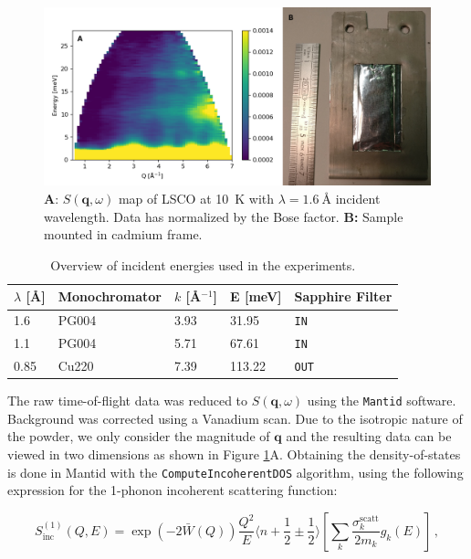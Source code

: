 \begin{figure}
    \centering
    \includegraphics[width=\textwidth]{fig/gdos/sample_sqw.png}
    \caption[$S(\bm{q}, \omega)$ map and picture of sample]{\textbf{A}: $S(\bm{q}, \omega)$ map of LSCO at \SI{10}{K} with $\lambda = \SI{1.6}{\angstrom}$ incident wavelength. Data has normalized by the Bose factor. \textbf{B:} Sample mounted in cadmium frame.}
    \label{fig:sample_sqw}
\end{figure}

\begin{table}[b]
    \centering
    \begin{tabular}{lllll}\toprule
    $\lambda$ [\AA] & Monochromator  & $k$ [\AA$^{-1}$] & E [meV] & Sapphire Filter     \\ \midrule
    1.6             & PG004 & 3.93            & 31.95   & \texttt{IN}  \\
    1.1             & PG004 & 5.71            & 67.61   & \texttt{IN}  \\
    0.85            & Cu220 & 7.39            & 113.22  & \texttt{OUT} \\ \bottomrule
    \end{tabular}
    \caption[IN4: Incident energies]{Overview of incident energies used in the experiments.}
    \label{tab:in4_mono}
\end{table}

The raw time-of-flight data was reduced to $S(\bm{q},\omega)$ using the \texttt{Mantid} \cite{Arnold2014} software. Background was corrected using a Vanadium scan. Due to the isotropic nature of the powder, we only consider the magnitude of $\bm{q}$ and the resulting data can be viewed in two dimensions as shown in Figure \ref{fig:sample_sqw}A. Obtaining the density-of-states is done in Mantid with the \texttt{ComputeIncoherentDOS} algorithm, using the following expression for the 1-phonon incoherent scattering function:

 \[ S^{(1)}_{\mathrm{inc}}(Q,E) = \exp\left(-2\bar{W}(Q)\right) \frac{Q^2}{E} \langle n+\frac{1}{2}\pm\frac{1}{2} \rangle \left[ \sum_k \frac{\sigma_k^{\mathrm{scatt}}}{2m_k} g_k(E) \right]\, , \]
 
